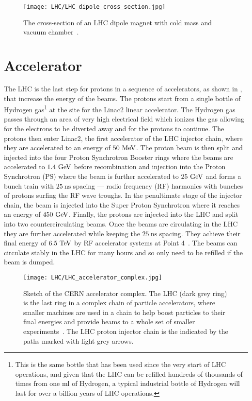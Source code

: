 \begin{figure}[htbp]
 \centering
 \texttt{[image: LHC/LHC\_dipole\_cross\_section.jpg]}
 \caption[The cross-section of an LHC dipole magnet with cold mass and vacuum chamber.]{%
  The cross-section of an LHC dipole magnet with cold mass and vacuum chamber~\cite{LHC:dipole}.}\label{fig:LHC_dipole_cross_section}
\end{figure}

\section{Accelerator}

The LHC is the last step for protons in a sequence of accelerators, as shown in , that increase the energy of the beams.
The protons start from a single bottle of Hydrogen gas\footnote{This is the same bottle that has been used since the very start of LHC operations, and given that the LHC can be refilled hundreds of thousands of times from one $\textrm{ml}$ of Hydrogen, a typical industrial bottle of Hydrogen will last for over a billion years of LHC operations.} at the site for the Linac2 linear accelerator.
The Hydrogen gas passes through an area of very high electrical field which ionizes the gas allowing for the electrons to be diverted away and for the protons to continue.
The protons then enter Linac2, the first accelerator of the LHC injector chain, where they are accelerated to an energy of $50~\mathrm{MeV}$.
The proton beam is then split and injected into the four Proton Synchrotron Booster rings where the beams are accelerated to $1.4~\mathrm{GeV}$ before recombination and injection into the \Gls{Proton Synchrotron} (PS) where the beam is further accelerated to $25~\mathrm{GeV}$ and forms a bunch train with $25~\textrm{ns}$ spacing --- radio frequency (RF) harmonics with bunches of protons surfing the RF wave troughs.
In the penultimate stage of the injector chain, the beam is injected into the Super Proton Synchrotron where it reaches an energy of $450~\mathrm{GeV}$.
Finally, the protons are injected into the LHC and split into two countercirculating beams.
Once the beams are circulating in the LHC they are further accelerated while keeping the $25~\textrm{ns}$ spacing.
They achieve their final energy of $6.5~\mathrm{TeV}$ by RF accelerator systems at Point 4~\cite{Evans:2008,Boussard:410377}.
The beams can circulate stably in the LHC for many hours and so only need to be refilled if the beam is dumped.

\begin{figure}[htbp]
 \centering
 \texttt{[image: LHC/LHC\_accelerator\_complex.jpg]}
 \caption[Sketch of the CERN accelerator complex.]{%
  Sketch of the CERN accelerator complex.
  The LHC (dark grey ring) is the last ring in a complex chain of particle accelerators, where smaller machines are used in a chain to help boost particles to their final energies and provide beams to a whole set of smaller experiments~\cite{Haffner:1621894}.
  The LHC proton injector chain is the indicated by the paths marked with light grey arrows.}\label{fig:LHC_accelerator_complex}
\end{figure}

